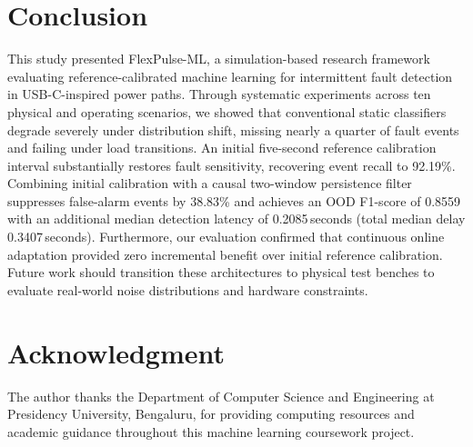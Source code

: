 \documentclass[conference]{IEEEtran}
\begin{document}
\section{Conclusion}
This study presented FlexPulse-ML, a simulation-based research framework evaluating reference-calibrated machine learning for intermittent fault detection in USB-C-inspired power paths. Through systematic experiments across ten physical and operating scenarios, we showed that conventional static classifiers degrade severely under distribution shift, missing nearly a quarter of fault events and failing under load transitions. An initial five-second reference calibration interval substantially restores fault sensitivity, recovering event recall to 92.19\%. Combining initial calibration with a causal two-window persistence filter suppresses false-alarm events by 38.83\% and achieves an OOD F1-score of 0.8559 with an additional median detection latency of 0.2085\,seconds (total median delay 0.3407\,seconds). Furthermore, our evaluation confirmed that continuous online adaptation provided zero incremental benefit over initial reference calibration. Future work should transition these architectures to physical test benches to evaluate real-world noise distributions and hardware constraints.

\section*{Acknowledgment}
The author thanks the Department of Computer Science and Engineering at Presidency University, Bengaluru, for providing computing resources and academic guidance throughout this machine learning coursework project.



\end{document}
